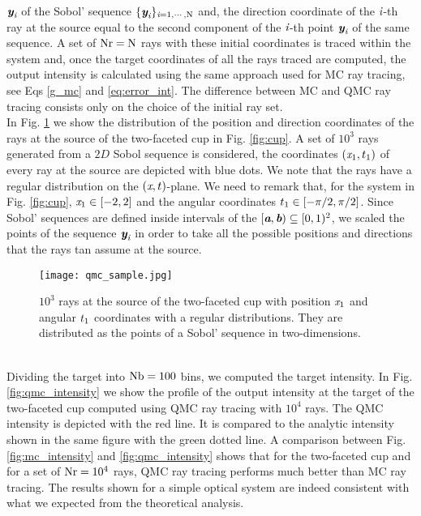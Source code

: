$\textit{\textbf{y}}_{\textit{i}}$ of the Sobol' sequence  $\{\textit{\textbf{y}}_{\textit{i}}\}_{\textit{i}=1, \cdots, \textrm{N}}$ and, the direction coordinate of the $\textit{i}$-th ray at the source equal to the second component of the $\textit{i}$-th point 
$\textit{\textbf{y}}_{\textit{i}}$ of the same sequence. A set of $\textrm{Nr} = \textrm{N}$ rays with these initial coordinates is traced within the system and, once the target coordinates of all the rays traced are computed, the output intensity is calculated using the same approach used for MC ray tracing, see Eqs \ref{g_mc} and \ref{eq:error_int}. The difference between MC and QMC ray tracing consists only on the choice of the initial ray set.\\ \indent
In Fig. \ref{fig:qmc_sample} we show the distribution of the position and direction coordinates of the rays at the source of the two-faceted cup in Fig. \ref{fig:cup}. 
A set of $10^3$ rays generated from a $2D$ Sobol sequence is considered, the coordinates $(\textit{x}_1, t_1)$ of every ray at the source are depicted with blue dots.
We note that the rays have a regular distribution on the $(\textit{x}, t)$-plane.
We need to remark that, for the system in Fig. \ref{fig:cup}, $\textit{x}_1 \in[-2,2]$ and the angular coordinates $t_1 \in[-\pi/2, \pi/2]$. 
Since Sobol' sequences are defined inside intervals of the  $[\textit{\textbf{a}}, \textit{\textbf{b}})\subseteq[0,1)^2$, we scaled the points of the sequence $\textit{\textbf{y}}_{\textit{i}}$ in order to take all the possible positions and directions that the rays tan assume at the source. 
\begin{figure}[h]
\begin{center}
    \texttt{[image: qmc\_sample.jpg]}
    \caption{$10^3$ rays at the source of the two-faceted cup with position $\textit{x}_1$ and angular $t_1$ coordinates with a regular distributions.
They are distributed as the points of a Sobol' sequence in two-dimensions.}
    \label{fig:qmc_sample}
\end{center}
  \end{figure}
\\ \indent Dividing the target into $\textrm{Nb}=100$ bins, we computed the target intensity. 
In Fig. \ref{fig:qmc_intensity} we show the profile of the output intensity at the target of the two-faceted cup computed using QMC ray tracing with $10^4$ rays. 
The QMC intensity is depicted with the red line. It is compared to the analytic intensity shown in the same figure with the green dotted line.
A comparison between Fig. \ref{fig:mc_intensity} and \ref{fig:qmc_intensity} shows that for the two-faceted cup and for a set of $\textrm{Nr}=10^4$ rays, QMC ray tracing performs much better than MC ray tracing. The results shown for a simple optical system are indeed consistent with what we expected from the theoretical analysis.
